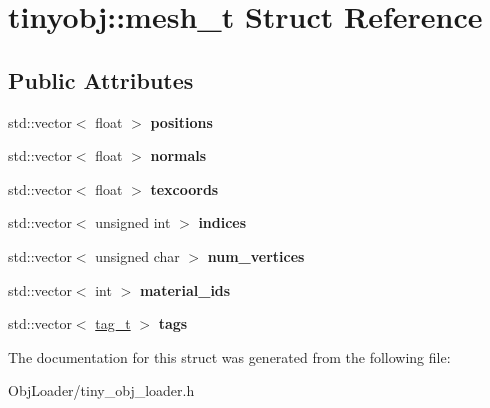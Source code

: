 \hypertarget{structtinyobj_1_1mesh__t}{}\section{tinyobj\+:\+:mesh\+\_\+t Struct Reference}
\label{structtinyobj_1_1mesh__t}
\subsection*{Public Attributes}
\begin{DoxyCompactItemize}
\item 
\mbox{\label{structtinyobj_1_1mesh__t_a3014a27913256384aa283345b69ff2ec}} 
std\+::vector$<$ float $>$ {\bfseries positions}
\item 
\mbox{\label{structtinyobj_1_1mesh__t_a28c2f7eb3114e6ed82a5b7326a4e7a1c}} 
std\+::vector$<$ float $>$ {\bfseries normals}
\item 
\mbox{\label{structtinyobj_1_1mesh__t_a0fc485afc76bcd7e147b22285d7d6575}} 
std\+::vector$<$ float $>$ {\bfseries texcoords}
\item 
\mbox{\label{structtinyobj_1_1mesh__t_aa0a07f40559a650e6917c506d78e298a}} 
std\+::vector$<$ unsigned int $>$ {\bfseries indices}
\item 
\mbox{\label{structtinyobj_1_1mesh__t_aa4858f9a5941c179f76d272b389af954}} 
std\+::vector$<$ unsigned char $>$ {\bfseries num\+\_\+vertices}
\item 
\mbox{\label{structtinyobj_1_1mesh__t_a57b2f12dfa3fd620b25babcd3a09ec6b}} 
std\+::vector$<$ int $>$ {\bfseries material\+\_\+ids}
\item 
\mbox{\label{structtinyobj_1_1mesh__t_a60f51d3802c11e2bf269530e0337fc63}} 
std\+::vector$<$ \hyperlink{structtinyobj_1_1tag__t}{tag\+\_\+t} $>$ {\bfseries tags}
\end{DoxyCompactItemize}


The documentation for this struct was generated from the following file\+:\begin{DoxyCompactItemize}
\item 
Obj\+Loader/tiny\+\_\+obj\+\_\+loader.\+h\end{DoxyCompactItemize}
